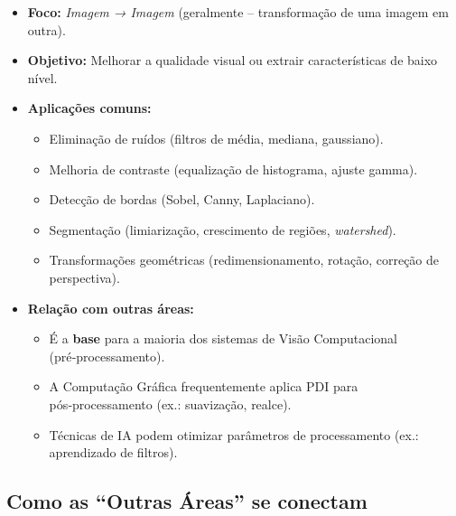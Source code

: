 \documentclass[
  portuguese,
  letterpaper,
  openany,
  oneside,
  12pt,
  a4paper]{book}
\providecommand{\tightlist}{%
  \setlength{\itemsep}{0pt}\setlength{\parskip}{0pt}}
\begin{document}
\begin{itemize}
\tightlist
\item
  \textbf{Foco:} \emph{Imagem → Imagem} (geralmente -- transformação de
  uma imagem em outra).\\
\item
  \textbf{Objetivo:} Melhorar a qualidade visual ou extrair
  características de baixo nível.\\
\item
  \textbf{Aplicações comuns:}

  \begin{itemize}
  \tightlist
  \item
    Eliminação de ruídos (filtros de média, mediana, gaussiano).
  \item
    Melhoria de contraste (equalização de histograma, ajuste gamma).
  \item
    Detecção de bordas (Sobel, Canny, Laplaciano).
  \item
    Segmentação (limiarização, crescimento de regiões,
    \emph{watershed}).
  \item
    Transformações geométricas (redimensionamento, rotação, correção de
    perspectiva).
  \end{itemize}
\item
  \textbf{Relação com outras áreas:}

  \begin{itemize}
  \tightlist
  \item
    É a \textbf{base} para a maioria dos sistemas de Visão Computacional
    (pré‑processamento).\\
  \item
    A Computação Gráfica frequentemente aplica PDI para
    pós‑processamento (ex.: suavização, realce).\\
  \item
    Técnicas de IA podem otimizar parâmetros de processamento (ex.:
    aprendizado de filtros).
  \end{itemize}
\end{itemize}

\subsection{Como as ``Outras Áreas'' se
conectam}\label{como-as-outras-uxe1reas-se-conectam}
\end{document}
